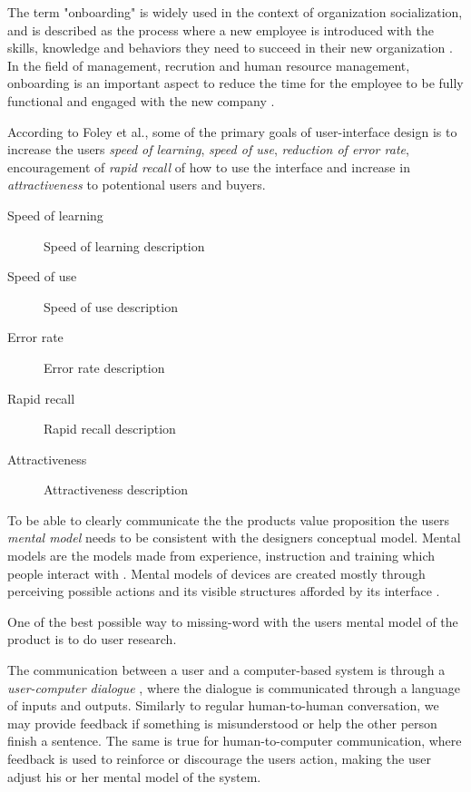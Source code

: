 
The term "onboarding" is widely used in the context of organization socialization, and is described as the process where a new employee is introduced with the skills, knowledge and behaviors they need to succeed in their new organization \cite{Bauer2011}. In the field of management, recrution and human resource management, onboarding is an important aspect to reduce the time for the employee to be fully functional and engaged with the new company \cite{GraybillJolieO;HudsonCarpenterMariaTaesil;OffordJeromeJr;PiorunMary;Shaffer2013}.


According to Foley et al., \cite{Foley1996} some of the primary goals of user-interface design is to increase the users \textit{speed of learning}, \textit{speed of use}, \textit{reduction of error rate}, encouragement of \textit{rapid recall} of how to use the interface and increase in \textit{attractiveness} to potentional users and buyers.

\begin{description}
  \item [Speed of learning] Speed of learning description
  \item [Speed of use] Speed of use description
  \item [Error rate]  Error rate description
  \item [Rapid recall] Rapid recall description
  \item [Attractiveness] Attractiveness description
\end{description}

To be able to clearly communicate the the products value proposition the users \textit{mental model} needs to be consistent with the designers conceptual model. Mental models are the models made from experience, instruction and training which people interact with \cite{Norman2013}. Mental models of devices are created mostly through perceiving possible actions and its visible structures afforded by its interface \cite{Norman2013}.

One of the best possible way to missing-word with the users mental model of the product is to do user research.

The communication between a user and a computer-based system is through a \textit{user-computer dialogue} \cite{Foley1996}, where the dialogue is communicated through a language of inputs and outputs. Similarly to regular human-to-human conversation, we may provide feedback if something is misunderstood or help the other person finish a sentence. The same is true for human-to-computer communication, where feedback is used to reinforce or discourage the users action, making the user adjust his or her mental model of the system.

